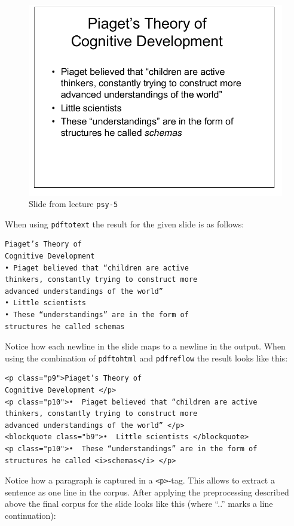 \documentclass[]{article}
\begin{document}
\begin{enumerate}
  \begin{figure}[htbp]
  \centering
  \includegraphics{images/slide_250.png}
  \caption{Slide from lecture \texttt{psy-5} \label{slide}}
  \end{figure}

  When using \texttt{pdftotext} the result for the given slide is as
  follows:

\begin{verbatim}
Piaget’s Theory of
Cognitive Development
• Piaget believed that “children are active
thinkers, constantly trying to construct more
advanced understandings of the world”
• Little scientists
• These “understandings” are in the form of
structures he called schemas
\end{verbatim}

  Notice how each newline in the slide maps to a newline in the output.
  When using the combination of \texttt{pdftohtml} and
  \texttt{pdfreflow} the result looks like this:

\begin{verbatim}
<p class="p9">Piaget’s Theory of
Cognitive Development </p>
<p class="p10">•  Piaget believed that “children are active
thinkers, constantly trying to construct more
advanced understandings of the world” </p>
<blockquote class="b9">•  Little scientists </blockquote>
<p class="p10">•  These “understandings” are in the form of
structures he called <i>schemas</i> </p>
\end{verbatim}

  Notice how a paragraph is captured in a
  \texttt{\textless{}p\textgreater{}}-tag. This allows to extract a
  sentence as one line in the corpus. After applying the preprocessing
  described above the final corpus for the slide looks like this (where
  ``..'' marks a line continuation):


\end{enumerate}
\end{document}
